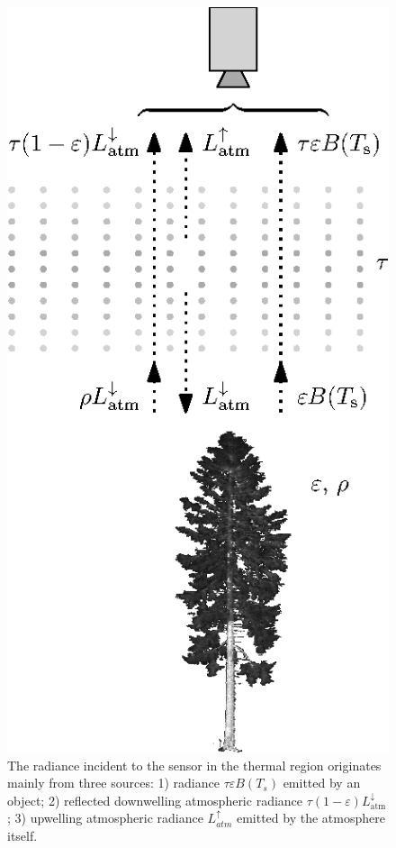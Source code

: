 \begin{figure}[htbp]
	\centering
	\vspace{1em}
	\includegraphics{pics/Chapter_02/Fig_3_2.eps}
	\vspace{1.5 em}
	\caption{The radiance incident to the sensor in the thermal region originates mainly from three sources: 1) radiance $\tau\varepsilon B(T_s)$ emitted by an object; 2) reflected downwelling atmospheric radiance $\tau(1-\varepsilon)L_\mathrm{atm}^\downarrow$; 3) upwelling atmospheric radiance $L_{atm}^\uparrow$ emitted by the atmosphere itself.}
	\label{fig:FigRTE}
\end{figure}

